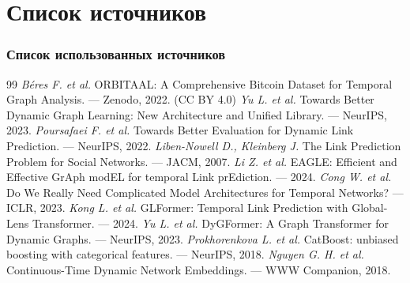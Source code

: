 \documentclass[aspectratio=169]{beamer}
\begin{document}
\section{Список источников}
\begin{frame}[allowframebreaks]
  \frametitle{Список использованных источников}
  \small
  \begin{thebibliography}{99}
     \textit{Béres F. et al.} ORBITAAL: A Comprehensive Bitcoin Dataset for Temporal Graph Analysis. — Zenodo, 2022. (CC BY 4.0)
     \textit{Yu L. et al.} Towards Better Dynamic Graph Learning: New Architecture and Unified Library. — NeurIPS, 2023.
     \textit{Poursafaei F. et al.} Towards Better Evaluation for Dynamic Link Prediction. — NeurIPS, 2022.
     \textit{Liben-Nowell D., Kleinberg J.} The Link Prediction Problem for Social Networks. — JACM, 2007.
     \textit{Li Z. et al.} EAGLE: Efficient and Effective GrAph modEL for temporal Link prEdiction. — 2024.
     \textit{Cong W. et al.} Do We Really Need Complicated Model Architectures for Temporal Networks? — ICLR, 2023.
     \textit{Kong L. et al.} GLFormer: Temporal Link Prediction with Global-Lens Transformer. — 2024.
     \textit{Yu L. et al.} DyGFormer: A Graph Transformer for Dynamic Graphs. — NeurIPS, 2023.
     \textit{Prokhorenkova L. et al.} CatBoost: unbiased boosting with categorical features. — NeurIPS, 2018.
     \textit{Nguyen G. H. et al.} Continuous-Time Dynamic Network Embeddings. — WWW Companion, 2018.
  \end{thebibliography}
\end{frame}
\end{document}

